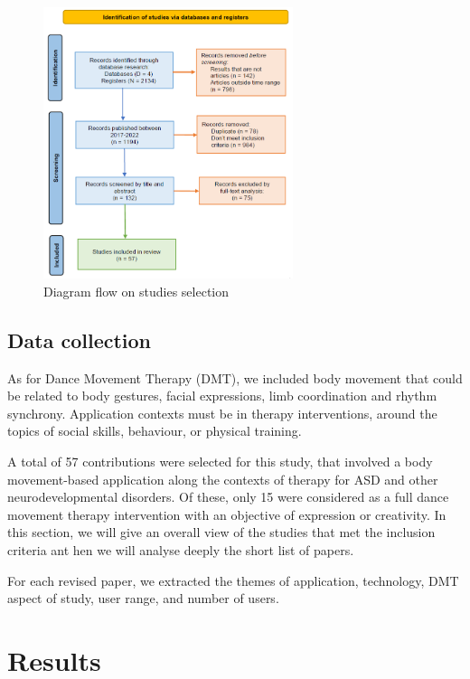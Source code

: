 \documentclass[a4paper,fleqn]{cas-sc}
\begin{document}
\begin{figure}
	\includegraphics[width=0.65\textwidth]{fig1_search_flow.png}
        \centering
	  \caption{Diagram flow on studies selection}\label{fig1}
        \label{fig:studies-flow}
\end{figure}

\subsection{Data collection}
As for Dance Movement Therapy (DMT), we included body movement that could be related to body gestures, facial expressions, limb coordination and rhythm synchrony. Application contexts must be in therapy interventions, around the topics of social skills, behaviour, or physical training.

A total of 57 contributions were selected for this study, that involved a body movement-based application along the contexts of therapy for ASD and other neurodevelopmental disorders. Of these, only 15 were considered as a full dance movement therapy intervention with an objective of expression or creativity. In this section, we will give an overall view of the studies that met the inclusion criteria ant hen we will analyse deeply the short list of papers.

For each revised paper, we extracted the themes of application, technology, DMT aspect of study, user range, and number of users.




\section{Results} 
\label{sec4:results}
\end{document}
